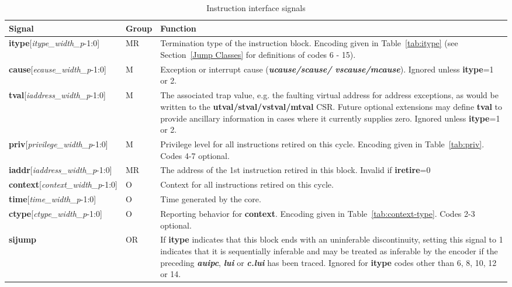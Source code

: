 \begin{table}[htp]
    \centering
    \caption{Instruction interface signals}
    \label{tab:common-ingress}
    \begin{tabulary}{\textwidth}{|l|l|p{80mm}|}
        \hline
        \textbf{Signal} & \textbf{Group} & \textbf{Function} \\
        \hline
        \textbf{itype}[\textit{itype\_width\_p}-1:0] & MR & Termination type of the instruction block.  Encoding given in Table~\ref{tab:itype}
         (see Section~\ref{Jump Classes} for definitions of codes 6 - 15).\\
        \hline
        \textbf{cause}[\textit{ecause\_width\_p}-1:0] & M & Exception or interrupt cause (\textbf{\textit{ucause/scause/ vscause/mcause}}).
        Ignored unless \textbf {itype}=1 or 2.\\
        \hline
        \textbf{tval}[\textit{iaddress\_width\_p}-1:0] & M & The associated trap value, e.g. the
        faulting virtual address for address exceptions, as would be
        written to the \textbf{utval/stval/vstval/mtval} CSR. Future optional extensions may define \textbf{tval} 
        to provide ancillary information in cases where it currently supplies zero.
        Ignored unless \textbf{itype}=1 or 2.\\
        \hline
        \textbf{priv}[\textit{privilege\_width\_p}-1:0] & M & Privilege level for all instructions retired on this cycle.
        Encoding given in Table~\ref{tab:priv}.  Codes 4-7 optional.\\
        \hline
        \textbf{iaddr}[\textit{iaddress\_width\_p}-1:0] & MR & The address of the 1st instruction retired in this block.
        Invalid if \textbf{iretire}=0 \\
        \hline
        \textbf{context}[\textit{context\_width\_p}-1:0] & O & Context for all instructions retired on this cycle.\\
        \hline
        \textbf{time}[\textit{time\_width\_p}-1:0] & O & Time generated by the core.\\
        \hline
        \textbf{ctype}[\textit{ctype\_width\_p}-1:0] & O & Reporting behavior for \textbf{context}.  
        Encoding given in Table~\ref{tab:context-type}.  Codes 2-3 optional.\\
        \hline
        \textbf{sijump} & OR & If \textbf{itype} indicates that this block ends with an uninferable discontinuity, setting this signal to 1 
        indicates that it is sequentially inferable and may be treated as inferable by the encoder if the preceding 
        \textbf{\textit{auipc}}, \textbf{\textit{lui}} or \textbf{\textit{c.lui}} has been traced.  
        Ignored for \textbf{itype} codes other than 6, 8, 10, 12 or 14.\\
        \hline
    \end{tabulary}
\end{table}

